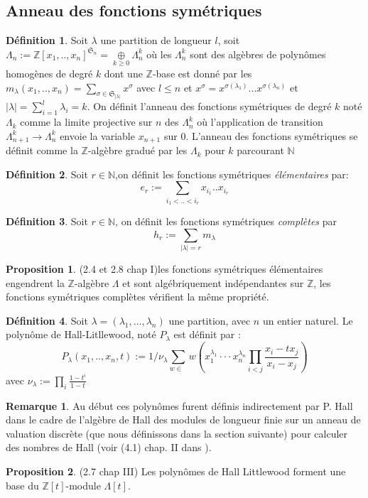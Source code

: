 \documentclass[12pt]{article}
\DeclareMathOperator{\sn}{\mathfrak{S}_n}
\theoremstyle{definition}
\newtheorem{Prop}{Proposition}[section]
\newtheorem{rem}{Remarque}[section]
\newtheorem{Def}{Définition}[section]
\begin{document}
\subsection{Anneau des fonctions symétriques}
\begin{Def}\label{symfun} Soit $\lambda$ une partition de longueur $l$, soit $\Lambda_n:=\mathbb{Z}[x_1,..,x_n]^{\mathfrak{S}_n}=\underset{k\geqslant 0}{\oplus}\Lambda_n^k$ où les $\Lambda_n^k$ sont des algèbres de polynômes homogènes de degré $k$ dont une $\mathbb{Z}$-base est donné par les $m_\lambda (x_1,..,x_n) =\underset{\sigma\in\mathfrak{S}_{\vert\lambda\vert}}{\sum}x^{\sigma}$ avec $l\leqslant n$ et $x^\sigma=x^{\sigma(\lambda_1)}...x^{\sigma(\lambda_n)}$ et $\vert\lambda\vert=\sum_{i=1}^{l}\lambda_i=k$. On définit l'anneau des fonctions symétriques de degré $k$ noté $\Lambda_k$ comme la limite projective sur $n$ des $\Lambda_n^k$ où l'application de transition $\Lambda^k_{n+1}\to\Lambda^k_{n}$ envoie la variable $x_{n+1}$ sur $0$. L'anneau des fonctions symétriques se définit comme la $\mathbb{Z}$-algèbre gradué par les $\Lambda_k$ pour $k$ parcourant $\mathbb{N}$
\end{Def}
\begin{Def}\label{symelem}Soit $r\in\mathbb{N}$,on définit les fonctions symétriques \textit{élémentaires} par:  $$e_r:=\underset{i_1<..<i_r}{\sum}x_{i_1}..x_{i_r}$$\end{Def}
\begin{Def}\label{symcomp}Soit $r\in\mathbb{N}$, on définit les fonctions symétriques \textit{complètes} par $$h_r:=\underset{\vert\lambda\vert=r}{\sum}m_{\lambda}$$\end{Def}
\begin{Prop}\cite{Macdonald} (2.4 et 2.8 chap I)\label{symelembase} les fonctions symétriques élémentaires engendrent la $\mathbb{Z}$-algèbre $\Lambda$ et sont algébriquement indépendantes sur $\mathbb{Z}$, les fonctions symétriques complètes vérifient la même propriété.\end{Prop}
\begin{Def}\label{HApol} Soit $\lambda=(\lambda_1,..., \lambda_n)$ une partition, avec $n$ un entier naturel. Le polynôme de Hall-Litllewood, noté $P_{\lambda}$ est définit par :$$P_{\lambda}(x_1,..,x_n,t):=1/\nu_{\lambda}\underset{w\in\sn}{\sum}w(x_1^{\lambda_1}\cdot\cdot\cdot x_n^{\lambda_n}\underset{i<j}{\prod}\frac{x_i-tx_j}{x_i-x_j})$$ avec $\nu_{\lambda}:=\underset{i}{\prod}\frac{1-t^i}{1-t}$\end{Def}
\begin{rem} Au début ces polynômes furent définis indirectement par P. Hall dans le cadre de l'algèbre de Hall des modules de longueur finie sur un anneau de valuation discrète (que nous définissons dans la section suivante) pour calculer des nombres de Hall (voir (4.1) chap. II dans \cite{Macdonald}).
\end{rem}
\begin{Prop}\cite{Macdonald} (2.7 chap III) \label{symbase} Les polynômes de Hall Littlewood forment une base du $\mathbb{Z}[t]$-module $\Lambda[t]$.\end{Prop}
\end{document}
